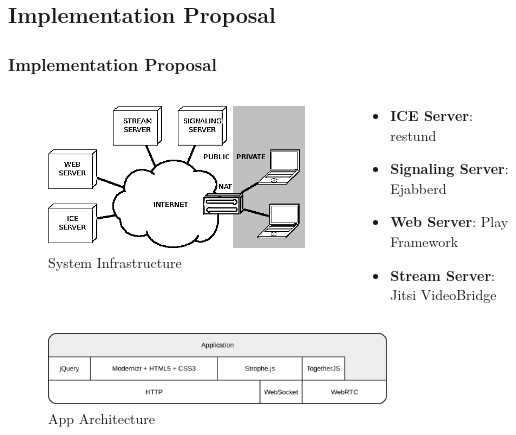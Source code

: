 \documentclass[compress]{beamer}
\begin{document}
\subsection{Implementation Proposal}

		\begin{frame}[c]
		\frametitle{Implementation Proposal}


\begin{columns}[c]
\begin{column}{.4\textwidth}
		\begin{figure}[H]
			\includegraphics[width=\textwidth]{figures/arch.png}
			\caption{System Infrastructure}
		\end{figure}
\end{column}
\begin{column}{.6\textwidth}

\begin{itemize}
\small
		\item \textbf{ICE Server}: restund
		\vfill
		\item \textbf{Signaling Server}: Ejabberd
		\vfill
		\item \textbf{Web Server}: Play Framework
		\vfill
		\item \textbf{Stream Server}: Jitsi VideoBridge
		\end{itemize}

\end{column}
\end{columns}



{
		\centering
		\begin{figure}[H]
			\includegraphics[width=0.8\textwidth]{figures/apparch.png}
			\caption{App Architecture}
		\end{figure}
}

		\end{frame}
\end{document}
